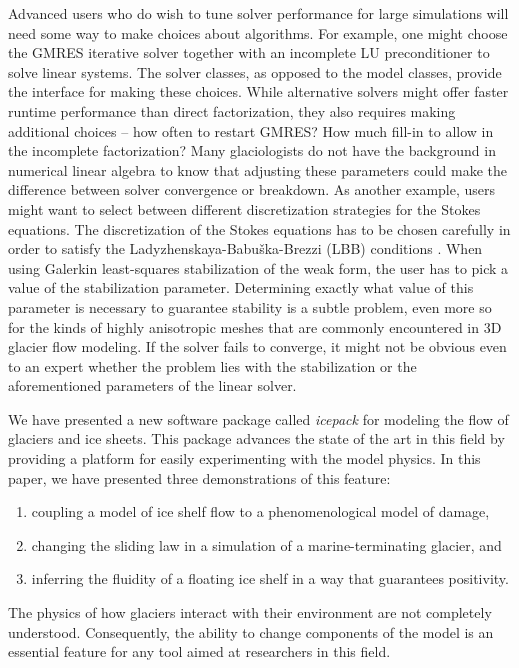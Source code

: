 \documentclass[journal abbreviation, manuscript]{copernicus}
\begin{document}
Advanced users who do wish to tune solver performance for large simulations will need some way to make choices about algorithms.
For example, one might choose the GMRES iterative solver together with an incomplete LU preconditioner to solve linear systems.
The solver classes, as opposed to the model classes, provide the interface for making these choices.
While alternative solvers might offer faster runtime performance than direct factorization, they also requires making additional choices -- how often to restart GMRES?
How much fill-in to allow in the incomplete factorization?
Many glaciologists do not have the background in numerical linear algebra to know that adjusting these parameters could make the difference between solver convergence or breakdown.
As another example, users might want to select between different discretization strategies for the Stokes equations.
The discretization of the Stokes equations has to be chosen carefully in order to satisfy the Ladyzhenskaya-Babu\v{s}ka-Brezzi (LBB) conditions \citep{boffi2013mixed}.
When using Galerkin least-squares stabilization of the weak form, the user has to pick a value of the stabilization parameter.
Determining exactly what value of this parameter is necessary to guarantee stability is a subtle problem, even more so for the kinds of highly anisotropic meshes that are commonly encountered in 3D glacier flow modeling.
If the solver fails to converge, it might not be obvious even to an expert whether the problem lies with the stabilization or the aforementioned parameters of the linear solver.


\conclusions  %

We have presented a new software package called \emph{icepack} for modeling the flow of glaciers and ice sheets.
This package advances the state of the art in this field by providing a platform for easily experimenting with the model physics.
In this paper, we have presented three demonstrations of this feature:
\begin{enumerate}
    \item coupling a model of ice shelf flow to a phenomenological model of damage,
    \item changing the sliding law in a simulation of a marine-terminating glacier, and
    \item inferring the fluidity of a floating ice shelf in a way that guarantees positivity.
\end{enumerate}
The physics of how glaciers interact with their environment are not completely understood.
Consequently, the ability to change components of the model is an essential feature for any tool aimed at researchers in this field.
\end{document}
